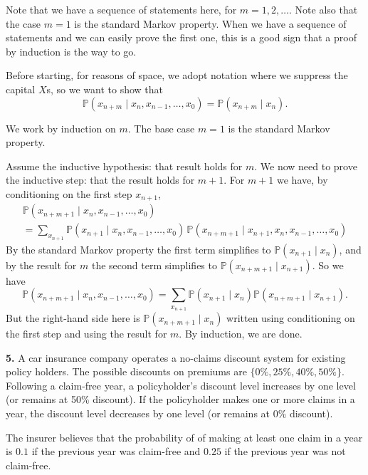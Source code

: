 \documentclass[
  a4paper,
]{article}
\theoremstyle{definition}
\theoremstyle{definition}
\theoremstyle{definition}
\theoremstyle{remark}
\begin{document}
\begin{myanswers}
Note that we have a sequence of statements here, for \(m = 1, 2, \dots\). Note also that the case \(m = 1\) is the standard Markov property. When we have a sequence of statements and we can easily prove the first one, this is a good sign that a proof by induction is the way to go.

Before starting, for reasons of space, we adopt notation where we suppress the capital \(X\)s, so we want to show that
\[ \mathbb P(x_{n+m} \mid x_n, x_{n-1}, \dots, x_0 ) = \mathbb P(x_{n+m} \mid x_n) . \]

We work by induction on \(m\). The base case \(m = 1\) is the standard Markov property.

Assume the inductive hypothesis: that result holds for \(m\). We now need to prove the inductive step: that the result holds for \(m+1\). For \(m+1\) we have, by conditioning on the first step \(x_{n+1}\),
\begin{multline*} \mathbb P(x_{n+m+1} \mid x_n, x_{n-1}, \dots, x_0 ) \\
 = \sum_{x_{n+1}} \mathbb P(x_{n+1} \mid x_n, x_{n-1}, \dots, x_0 )\,\mathbb P(x_{n+m+1} \mid x_{n+1}, x_n, x_{n-1}, \dots, x_0 )     \end{multline*}
By the standard Markov property the first term simplifies to \(\mathbb P(x_{n+1} \mid x_n)\), and by the result for \(m\) the second term simplifies to \(\mathbb P(x_{n+m+1} \mid x_{n+1})\). So we have
\[ \mathbb P(x_{n+m+1} \mid x_n, x_{n-1}, \dots, x_0 ) = \sum_{x_{n+1}} \mathbb P(x_{n+1} \mid x_n) \mathbb P(x_{n+m+1} \mid x_{n+1}) . \]
But the right-hand side here is \(\mathbb P(x_{n+m+1} \mid x_n)\) written using conditioning on the first step and using the result for \(m\). By induction, we are done.

\end{myanswers}

\textbf{5.} A car insurance company operates a no-claims discount system for existing policy holders. The possible discounts on premiums are \(\{0\%,25\%,40\%,50\%\}\). Following a claim-free year, a policyholder's discount level increases by one level (or remains at 50\% discount). If the policyholder makes one or more claims in a year, the discount level decreases by one level (or remains at 0\% discount).

The insurer believes that the probability of of making at least one claim in a year is \(0.1\) if the previous year was claim-free and \(0.25\) if the previous year was not claim-free.
\end{document}

